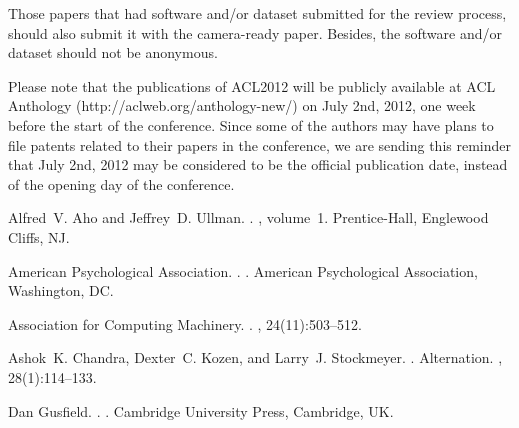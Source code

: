 \documentclass[11pt]{article}
\begin{document}
Those papers that had software and/or dataset submitted for the review process, should also submit it 
with the camera-ready paper. Besides, the software and/or dataset should not be anonymous. 

Please note that the publications of ACL2012 will be publicly available at ACL Anthology 
(http://aclweb.org/anthology-new/) on July 2nd, 2012, one week before the start of the conference. 
Since some of the authors may have plans to file patents related to their papers in the conference, 
we are sending this reminder that July 2nd, 2012 may be considered to be the official publication date, 
instead of the opening day of the conference.



\begin{thebibliography}{}

Alfred~V. Aho and Jeffrey~D. Ullman.
.
, volume~1.
\newblock Prentice-{Hall}, Englewood Cliffs, NJ.

{American Psychological Association}.
.
.
\newblock American Psychological Association, Washington, DC.

{Association for Computing Machinery}.
.
, 24(11):503--512.

Ashok~K. Chandra, Dexter~C. Kozen, and Larry~J. Stockmeyer.
.
\newblock Alternation.
,
  28(1):114--133.

Dan Gusfield.
.
.
\newblock Cambridge University Press, Cambridge, UK.

\end{thebibliography}
\end{document}
